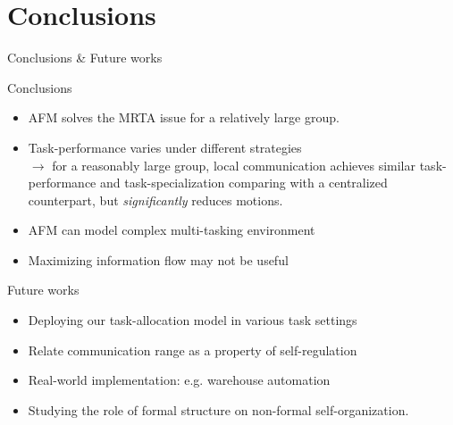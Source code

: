 \documentclass{beamer}
\begin{document}
\section{Conclusions}
\begin{frame}[t]{Conclusions \& Future works}
\begin{block}{Conclusions}
\begin{itemize}
    \item \small \alert{AFM solves the MRTA issue} for a relatively large group.\\
    \item \small \alert{Task-performance varies under different strategies}\\
    $\rightarrow$ \small for a reasonably large group, local  communication achieves similar task-performance and task-specialization comparing with a centralized counterpart, but \textit{significantly} reduces motions.    
    \item \small AFM can model complex \alert{multi-tasking environment}\\
    \item \small \alert{Maximizing information flow} may not be  useful\\
 \end{itemize}
 \end{block}
\begin{block}{Future works} 
 \begin{itemize}
    \item \small Deploying our task-allocation model \alert{in various task settings}\\
    \item \small Relate \alert{communication range} as a property of self-regulation\\
    \item \small \alert{Real-world implementation:} e.g. warehouse automation\\
     \item \small Studying the \alert{role of formal structure} on non-formal self-organization.
    \end{itemize}
\end{block}
\end{frame}
\end{document}
